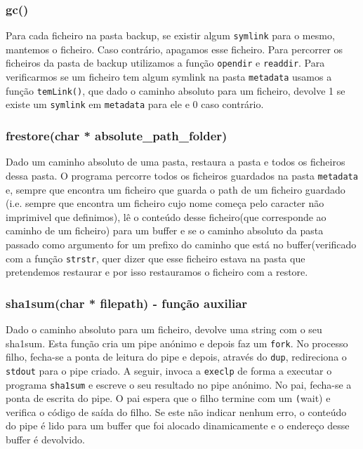 \documentclass[a4paper,12pt,titlepage,draft,portuguese]{article}
\begin{document}
\subsubsection{gc()}
Para cada ficheiro na pasta backup, se existir algum \texttt{symlink} para o mesmo, mantemos o ficheiro. Caso contrário, apagamos esse ficheiro.
Para percorrer os ficheiros da pasta de backup utilizamos a função \texttt{opendir} e \texttt{readdir}. Para verificarmos se um ficheiro tem algum symlink
na pasta \texttt{metadata} usamos a função \texttt{temLink()}, que dado o caminho absoluto para um ficheiro, devolve 1 se existe um \texttt{symlink} em \texttt{metadata} para ele e 0 caso contrário.

\subsubsection{frestore(char * absolute\_path\_folder)}
Dado um caminho absoluto de uma pasta, restaura a pasta e todos os ficheiros dessa pasta. 
O programa percorre todos os ficheiros guardados na pasta \texttt{metadata} e, sempre que encontra um ficheiro que guarda o path de um ficheiro guardado
(i.e. sempre que encontra um ficheiro cujo nome começa pelo caracter não imprimivel que definimos),
lê o conteúdo desse ficheiro(que corresponde ao caminho de um ficheiro) para um buffer e se o caminho absoluto da pasta passado como argumento for um prefixo 
do caminho que está no buffer(verificado com a função \texttt{strstr}, quer dizer que esse ficheiro estava na pasta que pretendemos restaurar e
 por isso restauramos o ficheiro com a restore.

\subsubsection{ sha1sum(char * filepath) - função auxiliar}
Dado o caminho absoluto para um ficheiro, devolve uma string com o seu sha1sum. Esta função cria um pipe anónimo e depois faz um \texttt{fork}. No processo filho,
fecha-se a ponta de leitura do pipe e depois, através do \texttt{dup}, redireciona o \texttt{stdout} para o pipe criado. A seguir, invoca a \texttt{execlp} 
de forma a executar o programa \texttt{sha1sum} e escreve o seu resultado no pipe anónimo. No pai, fecha-se a ponta de escrita do pipe.
O pai espera que o filho termine com um \texttt(wait) e verifica 
o código de saída do filho. Se este não indicar nenhum erro, o conteúdo do pipe é lido para um buffer que foi alocado dinamicamente e o endereço desse buffer
é devolvido.
\end{document}
